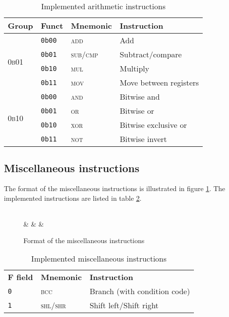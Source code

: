 \begin{table}[ht]
	\centering
	\begin{tabular}{|l l l l|}
		\hline
		\textbf{Group} & \textbf{Funct} & \textbf{Mnemonic} & \textbf{Instruction} \\
		\hline
		\multirow{4}{*}{\textsc{0b01}} & \texttt{0b00} & \textsc{add} & Add\\
		                               & \texttt{0b01} & \textsc{sub/cmp} & Subtract/compare\\
				               & \texttt{0b10} & \textsc{mul} & Multiply\\
				               & \texttt{0b11} & \textsc{mov} & Move between registers\\
		\hline
		\multirow{4}{*}{\textsc{0b10}} & \texttt{0b00} & \textsc{and} & Bitwise and\\
		                               & \texttt{0b01} & \textsc{or} & Bitwise or\\
				               & \texttt{0b10} & \textsc{xor} & Bitwise exclusive or\\
				               & \texttt{0b11} & \textsc{not} & Bitwise invert\\
		\hline
	\end{tabular}

	\label{tab:arith_instrs}
	\caption{Implemented arithmetic instructions}
\end{table}

\subsection{Miscellaneous instructions}
The format of the miscellaneous instructions is illustrated in figure \ref{fig:misc_instr_format}. The
implemented instructions are listed in table \ref{tab:misc_instrs}.

\begin{figure}[ht]
	\centering
	\begin{bytefield}[endianness=big,bitwidth=0.05\linewidth]{16}
		 \\
		 &
		 &
		 &
	\end{bytefield}

	\label{fig:misc_instr_format}
	\caption{Format of the miscellaneous instructions}
\end{figure}

\begin{table}[ht]
	\centering
	\begin{tabular}{|l l l|}
		\hline
		\textbf{F field} & \textbf{Mnemonic} & \textbf{Instruction} \\
		\texttt{0} & \textsc{bcc} & Branch (with condition code) \\
		\texttt{1} & \textsc{shl/shr} & Shift left/Shift right\\
		\hline
	\end{tabular}

	\label{tab:misc_instrs}
	\caption{Implemented miscellaneous instructions}
\end{table}


